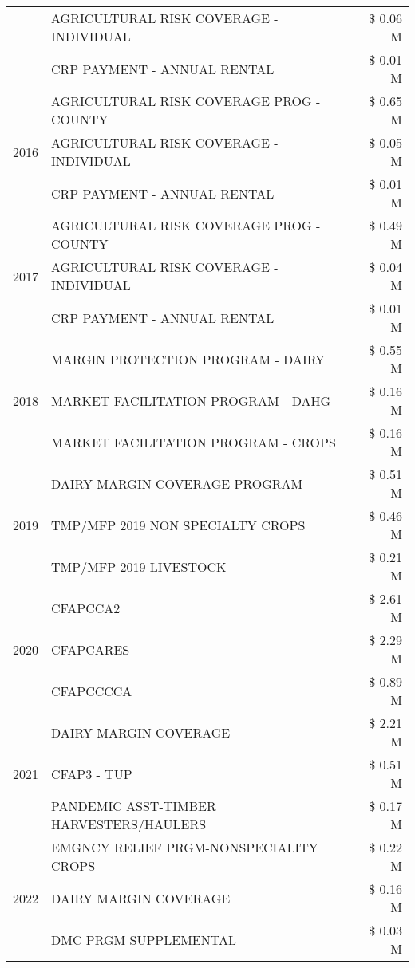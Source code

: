 \begin{tabular}{llr}
 & AGRICULTURAL RISK COVERAGE - INDIVIDUAL & \$ 0.06 M \\
 & CRP PAYMENT - ANNUAL RENTAL & \$ 0.01 M \\
\cline{1-3}
\multirow[t]{3}{*}{2016} & AGRICULTURAL RISK COVERAGE PROG - COUNTY & \$ 0.65 M \\
 & AGRICULTURAL RISK COVERAGE - INDIVIDUAL & \$ 0.05 M \\
 & CRP PAYMENT - ANNUAL RENTAL & \$ 0.01 M \\
\cline{1-3}
\multirow[t]{3}{*}{2017} & AGRICULTURAL RISK COVERAGE PROG - COUNTY & \$ 0.49 M \\
 & AGRICULTURAL RISK COVERAGE - INDIVIDUAL & \$ 0.04 M \\
 & CRP PAYMENT - ANNUAL RENTAL & \$ 0.01 M \\
\cline{1-3}
\multirow[t]{3}{*}{2018} & MARGIN PROTECTION PROGRAM - DAIRY & \$ 0.55 M \\
 & MARKET FACILITATION PROGRAM - DAHG & \$ 0.16 M \\
 & MARKET FACILITATION PROGRAM - CROPS & \$ 0.16 M \\
\cline{1-3}
\multirow[t]{3}{*}{2019} & DAIRY MARGIN COVERAGE PROGRAM & \$ 0.51 M \\
 & TMP/MFP 2019 NON SPECIALTY CROPS & \$ 0.46 M \\
 & TMP/MFP 2019 LIVESTOCK & \$ 0.21 M \\
\cline{1-3}
\multirow[t]{3}{*}{2020} & CFAPCCA2 & \$ 2.61 M \\
 & CFAPCARES & \$ 2.29 M \\
 & CFAPCCCCA & \$ 0.89 M \\
\cline{1-3}
\multirow[t]{3}{*}{2021} & DAIRY MARGIN COVERAGE & \$ 2.21 M \\
 & CFAP3 - TUP & \$ 0.51 M \\
 & PANDEMIC ASST-TIMBER HARVESTERS/HAULERS & \$ 0.17 M \\
\cline{1-3}
\multirow[t]{3}{*}{2022} & EMGNCY RELIEF PRGM-NONSPECIALITY CROPS & \$ 0.22 M \\
 & DAIRY MARGIN COVERAGE & \$ 0.16 M \\
 & DMC PRGM-SUPPLEMENTAL & \$ 0.03 M \\
\cline{1-3}
\bottomrule
\end{tabular}
